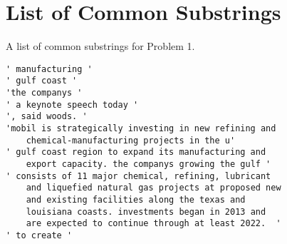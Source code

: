 \documentclass[12pt]{article}
\begin{document}
\section{List of Common Substrings}
\label{sec:substr}

A list of common substrings for Problem 1.

\begin{small}
\begin{verbatim}
' manufacturing '
' gulf coast '
'the companys '
' a keynote speech today '
', said woods. '
'mobil is strategically investing in new refining and 
    chemical-manufacturing projects in the u'
' gulf coast region to expand its manufacturing and 
    export capacity. the companys growing the gulf '
' consists of 11 major chemical, refining, lubricant 
    and liquefied natural gas projects at proposed new
    and existing facilities along the texas and 
    louisiana coasts. investments began in 2013 and 
    are expected to continue through at least 2022.  '
' to create '

\end{verbatim}
\end{small}
\end{document}
